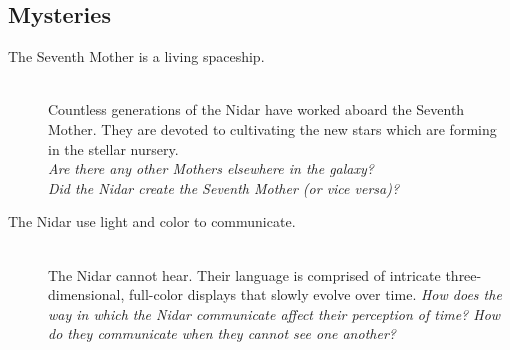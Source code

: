 \documentclass[11pt, a5paper, parskip=half-, DIV=12]{scrartcl}
\begin{document}
\subsection*{Mysteries}
\begin{description}
	\item[The Seventh Mother is a living spaceship.] \phantom{} \\ Countless generations of the Nidar have worked aboard the Seventh Mother. They are devoted to cultivating the new stars which are forming in the stellar nursery. \\ \textit{Are there any other Mothers elsewhere in the galaxy? \\ Did the Nidar create the Seventh Mother (or vice versa)?}
	\item[The Nidar use light and color to communicate.] \phantom{a} \\ The Nidar cannot hear. Their language is comprised of intricate three-dimensional, full-color displays that slowly evolve over time. \textit{How does the way in which the Nidar communicate affect their perception of time? How do they communicate when they cannot see one another?}
\end{description}

\newpage



\newpage

\thispagestyle{empty}
\end{document}
